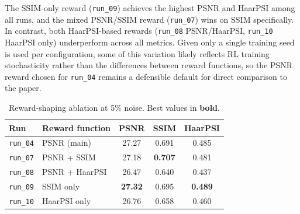 The SSIM-only reward (\texttt{run\_09}) achieves the highest PSNR and HaarPSI among all runs, and the mixed PSNR/SSIM reward (\texttt{run\_07}) wins on SSIM specifically. In contrast, both HaarPSI-based rewards (\texttt{run\_08} PSNR/HaarPSI, \texttt{run\_10} HaarPSI only) underperform across all metrics. Given only a single training seed is used per configuration, some of this variation likely reflects RL training stochasticity rather than the differences between reward functions, so the PSNR reward chosen for \texttt{run\_04} remains a defensible default for direct comparison to the paper.

\begin{table}[H]
    \centering
    \footnotesize
    \caption{Reward-shaping ablation at 5\% noise. Best values in \textbf{bold}.}
    \label{tab:reward_shaping}
    \begin{tabular}{llccc}
        \toprule
        Run & Reward function & PSNR & SSIM & HaarPSI \\
        \midrule
        \texttt{run\_04} & PSNR (main)     & 27.27          & 0.691          & 0.485          \\
        \texttt{run\_07} & PSNR + SSIM     & 27.18          & \textbf{0.707} & 0.481          \\
        \texttt{run\_08} & PSNR + HaarPSI  & 26.47          & 0.640          & 0.437          \\
        \texttt{run\_09} & SSIM only       & \textbf{27.32} & 0.695          & \textbf{0.489} \\
        \texttt{run\_10} & HaarPSI only    & 26.76          & 0.658          & 0.460          \\
        \bottomrule
    \end{tabular}
\end{table}
